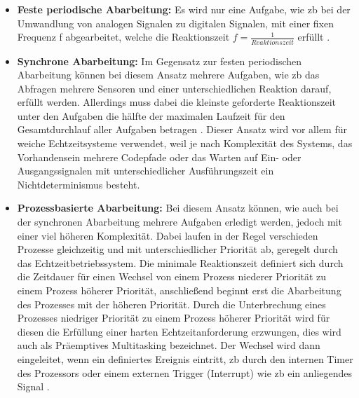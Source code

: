 \documentclass[../EDF Master Thesis.tex]{subfiles}
\begin{document}
    \begin{itemize}
        \item \textbf{Feste periodische Abarbeitung:} Es wird nur eine Aufgabe, wie \ac{zb} bei der Umwandlung von analogen Signalen zu digitalen Signalen, mit einer fixen Frequenz f abgearbeitet, welche die Reaktionszeit $ f = \frac{1}{Reaktionszeit}$ erfüllt \autocite{wiki:001, echtzeit-grundlagen}.
        \item \textbf{Synchrone Abarbeitung:} Im Gegensatz zur festen periodischen Abarbeitung können bei diesem Ansatz mehrere Aufgaben, wie \ac{zb} das Abfragen mehrere Sensoren und einer unterschiedlichen Reaktion darauf, erfüllt werden.
            Allerdings muss dabei die kleinste geforderte Reaktionszeit unter den Aufgaben die hälfte der maximalen Laufzeit für den Gesamtdurchlauf aller Aufgaben betragen \autocite{wiki:001, echtzeit-grundlagen}.
            Dieser Ansatz wird vor allem für weiche Echtzeitsysteme verwendet, weil je nach Komplexität des Systems, das Vorhandensein mehrere Codepfade oder das Warten auf Ein- oder Ausgangssignalen mit unterschiedlicher Ausführungszeit ein Nichtdeterminismus besteht.
        \item \textbf{Prozessbasierte Abarbeitung:} Bei diesem Ansatz können, wie auch bei der synchronen Abarbeitung mehrere Aufgaben erledigt werden, jedoch mit einer viel höheren Komplexität.
            Dabei laufen in der Regel verschieden Prozesse gleichzeitig und mit unterschiedlicher Priorität ab, geregelt durch das Echtzeitbetriebssystem.
            Die minimale Reaktionszeit definiert sich durch die Zeitdauer für einen Wechsel von einem Prozess niederer Priorität zu einem Prozess höherer Priorität, anschließend beginnt erst die Abarbeitung des Prozesses mit der höheren Priorität.
            Durch die Unterbrechung eines Prozesses niedriger Priorität zu einem Prozess höherer Priorität wird für diesen die Erfüllung einer harten Echtzeitanforderung erzwungen, dies wird auch als Präemptives Multitasking bezeichnet.
            Der Wechsel wird dann eingeleitet, wenn ein definiertes Ereignis eintritt, \ac{zb} durch den internen Timer des Prozessors oder einem externen Trigger (Interrupt) wie \ac{zb} ein anliegendes Signal \autocite{wiki:001, echtzeit-grundlagen}.
    \end{itemize}
\end{document}
